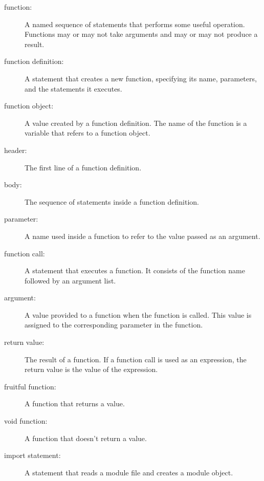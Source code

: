 \documentclass[10pt]{book}
\begin{document}
\begin{description}

\item[function:] A named sequence of statements that performs some
useful operation.  Functions may or may not take arguments and may or
may not produce a result.

\item[function definition:]  A statement that creates a new function,
specifying its name, parameters, and the statements it executes.

\item[function object:]  A value created by a function definition.
The name of the function is a variable that refers to a function
object.

\item[header:] The first line of a function definition.

\item[body:] The sequence of statements inside a function definition.

\item[parameter:] A name used inside a function to refer to the value
passed as an argument.

\item[function call:] A statement that executes a function. It
consists of the function name followed by an argument list.

\item[argument:]  A value provided to a function when the function is called.
This value is assigned to the corresponding parameter in the function.

\item[return value:]  The result of a function.  If a function call
is used as an expression, the return value is the value of
the expression.

\item[fruitful function:] A function that returns a value.

\item[void function:] A function that doesn't return a value.

\item[import statement:] A statement that reads a module file and creates
a module object.


\end{description}
\end{document}
